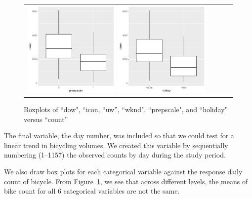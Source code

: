 \documentclass [11pt, proquest] {uwthesis}[2015/03/03]
\begin{document}
\begin{figure}
\begin{tabular}{ll}
\includegraphics[width=0.45\textwidth]{figures/scale_cat}
\includegraphics[width=0.45\textwidth]{figures/holiday_cat}\\
\end{tabular}
\vspace{-10pt}
\caption{Boxplots of ``dow", ``icon, ``uw'', ``wknd", ``prepscale", and ``holiday"  versus ``count''}
\label{fig:cat_bxplot}
\end{figure}


The final variable, the day number, was included so that we could test
for a linear trend in bicycling volumes. We created this variable by
sequentially numbering (1--1157) the observed counts by day during the
study period.

We also draw box plots for each categorical variable against the response daily count of bicycle. From Figure~\ref{fig:cat_bxplot}, we see that across different levels, the means of bike count for all 6 categorical variables are not the same.

%
\end{document}

